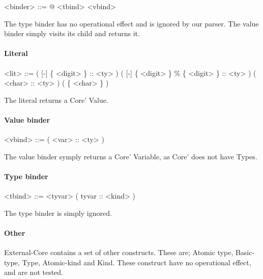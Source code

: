 \begin{grammar}
<binder> ::= @ <tbind>
        \alt <vbind>
\end{grammar}

The type binder has no operational effect and is ignored by our parser. The 
value binder simply visits its child and returns it.
\paragraph{Literal}

\begin{grammar}
<lit> ::= ( [-] \{ <digit> \} :: <ty> )
     \alt ( [-] \{ <digit> \} \% \{ <digit> \} :: <ty> )
     \alt ( <char> :: <ty> )
     \alt ( \{ <char> \} )
\end{grammar}

The literal returns a Core' Value.


\paragraph{Value binder}

\begin{grammar}
<vbind> ::= ( <var> :: <ty> )
\end{grammar}

The value binder symply returns a Core' Variable, as Core' does not have Types.


\paragraph{Type binder}

\begin{grammar}
<tbind> ::= <tyvar>
       \alt ( tyvar :: <kind> )
\end{grammar}

The type binder is simply ignored.

\paragraph{Other}

External-Core contains a set of other constructs. These are;
Atomic type, Basic-type, Type, Atomic-kind and Kind. These construct
have no operational effect, and are not tested.

